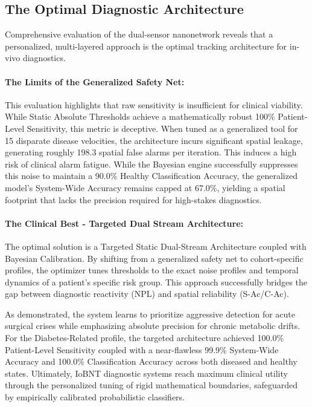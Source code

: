 \documentclass[sigconf]{acmart}
\begin{document}
\subsection{The Optimal Diagnostic Architecture}
Comprehensive evaluation of the dual-sensor nanonetwork reveals that a personalized, multi-layered approach is the optimal tracking architecture for in-vivo diagnostics.

\paragraph{The Limits of the Generalized Safety Net:}
This evaluation highlights that raw sensitivity is insufficient for clinical viability. While Static Absolute Thresholds achieve a mathematically robust 100\% Patient-Level Sensitivity, this metric is deceptive. When tuned as a generalized tool for 15 disparate disease velocities, the architecture incurs significant spatial leakage, generating roughly 198.3 spatial false alarms per iteration. This induces a high risk of clinical alarm fatigue. While the Bayesian engine successfully suppresses this noise to maintain a 90.0\% Healthy Classification Accuracy, the generalized model's System-Wide Accuracy remains capped at 67.0\%, yielding a spatial footprint that lacks the precision required for high-stakes diagnostics.

\paragraph{The Clinical Best - Targeted Dual Stream Architecture:}
The optimal solution is a Targeted Static Dual-Stream Architecture coupled with Bayesian Calibration. By shifting from a generalized safety net to cohort-specific profiles, the optimizer tunes thresholds to the exact noise profiles and temporal dynamics of a patient’s specific risk group. This approach successfully bridges the gap between diagnostic reactivity (NPL) and spatial reliability (S-Ac/C-Ac). 

As demonstrated, the system learns to prioritize aggressive detection for acute surgical crises while emphasizing absolute precision for chronic metabolic drifts. For the Diabetes-Related profile, the targeted architecture achieved 100.0\% Patient-Level Sensitivity coupled with a near-flawless 99.9\% System-Wide Accuracy and 100.0\% Classification Accuracy across both diseased and healthy states. Ultimately, IoBNT diagnostic systems reach maximum clinical utility through the personalized tuning of rigid mathematical boundaries, safeguarded by empirically calibrated probabilistic classifiers.
\end{document}
